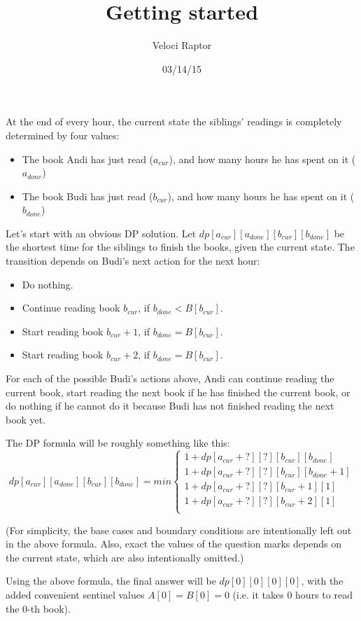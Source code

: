 \documentclass[12pt]{article}
\title{Getting started}
\author{Veloci Raptor}
\date{03/14/15}
\begin{document}
At the end of every hour, the current state the siblings' readings is completely determined by four values:

\begin{itemize}
	\item The book Andi has just read ($a_{cur}$), and how many hours he has spent on it ($a_{done}$)
	\item The book Budi has just read ($b_{cur}$), and how many hours he has spent on it ($b_{done}$)
\end{itemize}

Let's start with an obvious DP solution. Let $dp[a_{cur}][a_{done}][b_{cur}][b_{done}]$ be the shortest time for the siblings to finish the books, given the current state. The transition depends on Budi's next action for the next hour:

\begin{itemize}
  \item Do nothing.
  \item Continue reading book $b_{cur}$, if $b_{done} < B[b_{cur}]$.
  \item Start reading book $b_{cur}+1$, if $b_{done} = B[b_{cur}]$.
  \item Start reading book $b_{cur}+2$, if $b_{done} = B[b_{cur}]$.
\end{itemize}

For each of the possible Budi's actions above, Andi can continue reading the current book, start reading the next book if he has finished the current book, or do nothing if he cannot do it because Budi has not finished reading the next book yet.


The DP formula will be roughly something like this:
\[
dp[a_{cur}][a_{done}][b_{cur}][b_{done}] = min 
\begin{cases}
  1 + dp[a_{cur}+?][?][b_{cur}][b_{done}] \\
  1 + dp[a_{cur}+?][?][b_{cur}][b_{done}+1] \\
  1 + dp[a_{cur}+?][?][b_{cur}+1][1] \\
  1 + dp[a_{cur}+?][?][b_{cur}+2][1] \\
\end{cases}
\]

(For simplicity, the base cases and boundary conditions are intentionally left out in the above formula. Also, exact the values of the question marks depends on the current state, which are also intentionally omitted.)

Using the above formula, the final answer will be $dp[0][0][0][0]$, with the added convenient sentinel values $A[0] = B[0] = 0$ (i.e. it takes $0$ hours to read the $0$-th book).
\end{document}
